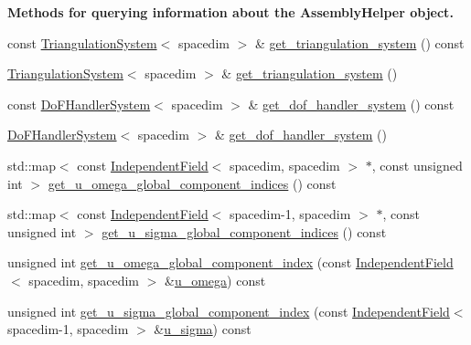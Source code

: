 \begin{Indent}{\bf Methods for querying information about the Assembly\+Helper object.}\par
\begin{DoxyCompactItemize}
\item 
const \hyperlink{class_triangulation_system}{Triangulation\+System}$<$ spacedim $>$ \& \hyperlink{class_assembly_helper_a261ecb9213338856aa88c8ae60a44c78}{get\+\_\+triangulation\+\_\+system} () const 
\item 
\hyperlink{class_triangulation_system}{Triangulation\+System}$<$ spacedim $>$ \& \hyperlink{class_assembly_helper_a16f9d21a79922d4879e37916b414f7d0}{get\+\_\+triangulation\+\_\+system} ()
\item 
const \hyperlink{class_do_f_handler_system}{Do\+F\+Handler\+System}$<$ spacedim $>$ \& \hyperlink{class_assembly_helper_ab8e95f0469f1595ab00c3fb48bcaf4fd}{get\+\_\+dof\+\_\+handler\+\_\+system} () const 
\item 
\hyperlink{class_do_f_handler_system}{Do\+F\+Handler\+System}$<$ spacedim $>$ \& \hyperlink{class_assembly_helper_a04523eef6062ced8c88d4c093b65df3d}{get\+\_\+dof\+\_\+handler\+\_\+system} ()
\item 
std\+::map$<$ const \hyperlink{class_independent_field}{Independent\+Field}$<$ spacedim, spacedim $>$ $\ast$, const unsigned int $>$ \hyperlink{class_assembly_helper_a396b89981e546af6b9bc0e35634290b3}{get\+\_\+u\+\_\+omega\+\_\+global\+\_\+component\+\_\+indices} () const 
\item 
std\+::map$<$ const \hyperlink{class_independent_field}{Independent\+Field}$<$ spacedim-\/1, spacedim $>$ $\ast$, const unsigned int $>$ \hyperlink{class_assembly_helper_aca4d34e08f177e8d075c86bb34906f2f}{get\+\_\+u\+\_\+sigma\+\_\+global\+\_\+component\+\_\+indices} () const 
\item 
unsigned int \hyperlink{class_assembly_helper_a41bdbb21e3f77cf717c9f7465363e415}{get\+\_\+u\+\_\+omega\+\_\+global\+\_\+component\+\_\+index} (const \hyperlink{class_independent_field}{Independent\+Field}$<$ spacedim, spacedim $>$ \&\hyperlink{class_assembly_helper_a1952a054a839a7a683ca108013e7d976}{u\+\_\+omega}) const 
\item 
unsigned int \hyperlink{class_assembly_helper_a9a8e7a9f29b275dc20811cac001bd18f}{get\+\_\+u\+\_\+sigma\+\_\+global\+\_\+component\+\_\+index} (const \hyperlink{class_independent_field}{Independent\+Field}$<$ spacedim-\/1, spacedim $>$ \&\hyperlink{class_assembly_helper_a696fe649b3503561235aa1ccbf2ddeef}{u\+\_\+sigma}) const 

\end{DoxyCompactItemize}
\end{Indent}
